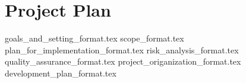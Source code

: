 \documentclass{article}
\begin{document}

\section*{Project Plan}
{goals_and_setting_format.tex}
{scope_format.tex}
{plan_for_implementation_format.tex}
{risk_analysis_format.tex}
{quality_assurance_format.tex}
{project_origanization_format.tex}
{development_plan_format.tex}



\end{document}
